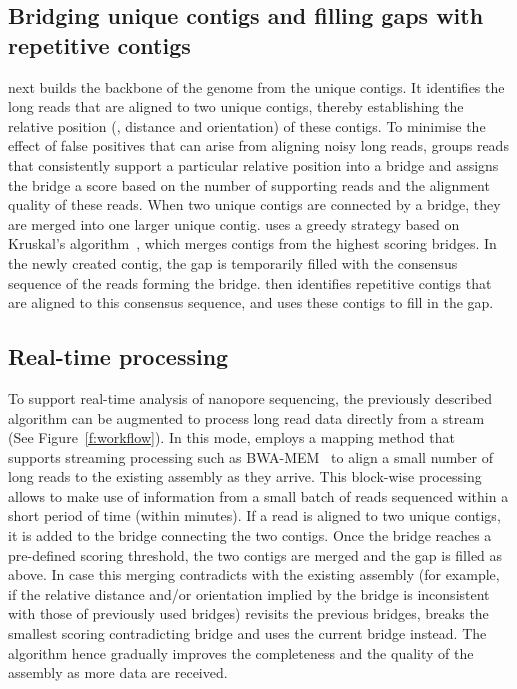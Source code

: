 \subsection{Bridging unique contigs and filling gaps with repetitive contigs}
\npscarf{} next builds the backbone of the genome from the unique contigs.
It identifies the long reads that are aligned to two unique contigs, thereby
establishing the relative position (\IE, distance and orientation) of these
contigs. To minimise the effect of false positives that can arise from
aligning noisy long reads, \npscarf{} groups reads that consistently support
a particular relative position into a bridge and assigns the bridge 
a score based on the number of supporting reads and the alignment quality of
these reads. When two unique contigs are connected by a bridge, they are merged
into one larger unique contig. \npscarf{} uses a greedy strategy based on 
Kruskal's algorithm~\cite{Kruskal1956}, which merges contigs from the highest
scoring bridges. In the newly created contig, the gap is temporarily filled with
the consensus sequence of the reads forming the bridge. \npscarf{} then identifies
repetitive contigs that are aligned to this consensus sequence, and uses these
contigs to fill in the gap.


\subsection{Real-time processing}
To support real-time analysis of nanopore sequencing, the previously described
algorithm can be augmented to process long read data directly from a stream
(See Figure~\ref{f:workflow}).
In this mode, \npscarf{} employs a mapping method that supports streaming
processing such as BWA-MEM~\cite{Li2013} to align a small number of long reads
to the existing assembly as they arrive. This block-wise processing allows
\npscarf{} to make use of information from a small batch of reads sequenced
within a short period of time (within minutes). If a read is aligned to two
unique contigs, it is added to the bridge connecting the two contigs. Once the bridge
reaches a pre-defined scoring threshold,
the two contigs are merged and the gap is filled as above. 
In case this merging contradicts with the existing assembly (for example, if the
relative distance and/or orientation implied by the bridge is inconsistent with 
those of previously used bridges) \npscarf{} revisits the previous bridges, breaks
the smallest scoring contradicting bridge and uses the current bridge instead. 
The algorithm hence gradually improves the completeness and the quality of the 
assembly as more data are received.

